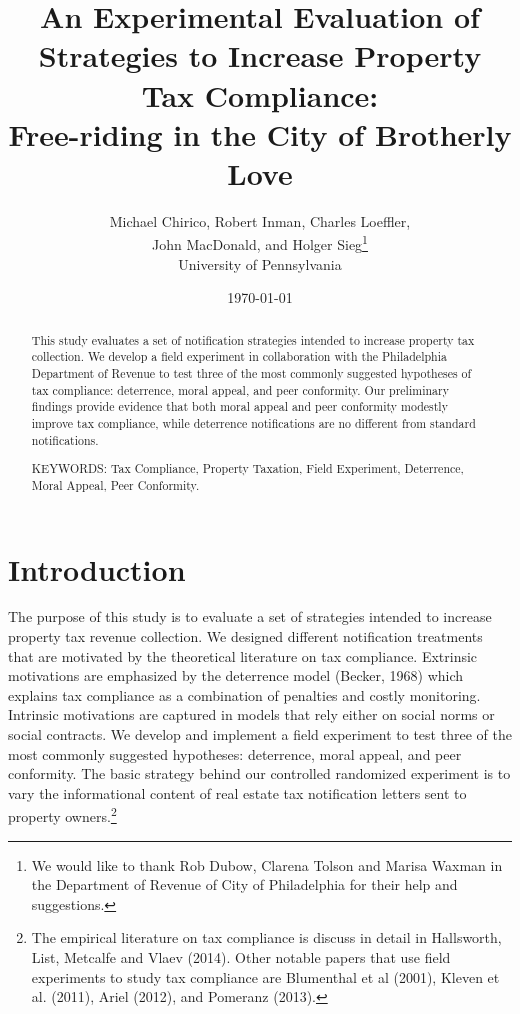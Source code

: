 \documentclass[12pt,titlepage]{article}
\renewcommand{\thefootnote}{\fnsymbol{footnote}}
\begin{document}
\title{An Experimental Evaluation of Strategies to Increase Property Tax Compliance: \\
Free-riding in the City of Brotherly Love}
\author{Michael Chirico, Robert Inman, Charles Loeffler, \\
John MacDonald, and Holger Sieg\thanks{We would like to thank  Rob Dubow, Clarena Tolson  and Marisa Waxman  in the 
Department of Revenue of City of Philadelphia for their help and suggestions.}
\\
University of Pennsylvania}
\date{\today}  

\maketitle

\begin{abstract}
This study evaluates a set of notification strategies intended to increase property tax 
collection. We develop a field experiment in collaboration with the Philadelphia 
Department of Revenue  to test three of the most commonly
suggested hypotheses of tax compliance: deterrence, moral appeal, and peer conformity.
Our preliminary findings provide evidence that both moral appeal
and peer conformity modestly improve tax compliance, while deterrence
notifications are no different from standard notifications. 

\noindent KEYWORDS:  Tax Compliance, Property Taxation, Field Experiment, Deterrence, Moral Appeal, Peer Conformity.

\end{abstract}

\newpage

\renewcommand{\thefootnote}{\arabic{footnote}}

\renewcommand{\thefootnote}{\arabic{footnote}}

\section{Introduction}

The purpose of this study is to evaluate a set of
strategies intended to increase property tax revenue
collection.  We designed different notification treatments that are
motivated by the theoretical literature on tax compliance. 
Extrinsic motivations are emphasized by the deterrence
model (Becker, 1968) which explains tax compliance as a combination of penalties and
costly monitoring. Intrinsic motivations are captured in models that
rely either on social norms or social contracts.  We develop and
implement a field experiment to test three of the most commonly
suggested hypotheses: deterrence, moral appeal, and peer conformity.
The basic strategy behind our controlled randomized experiment is to
vary the informational content of real estate tax notification letters sent 
to property owners.\footnote{The empirical literature on tax compliance 
is discuss in detail in Hallsworth, List, Metcalfe and Vlaev (2014). 
Other  notable papers that use field experiments to study tax compliance are 
Blumenthal et al (2001), Kleven et al. (2011), Ariel (2012), and Pomeranz (2013).}
\end{document}
